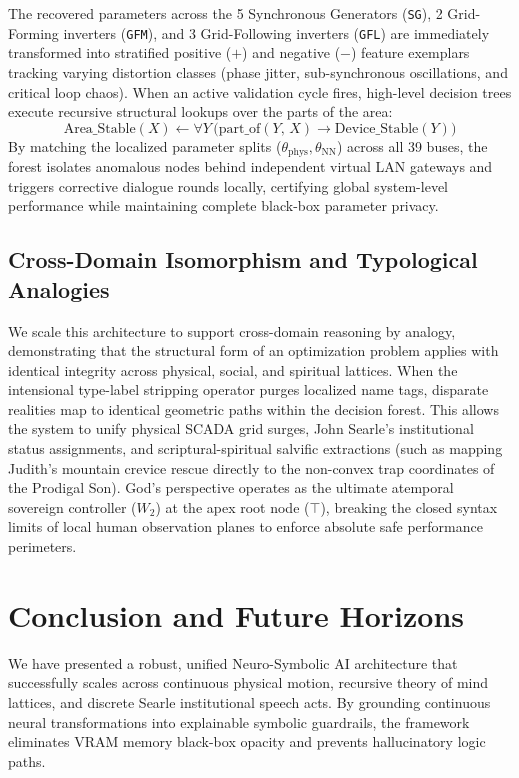 \documentclass[11pt,fleqn]{article}
\begin{document}
The recovered parameters across the 5 Synchronous Generators (\texttt{SG}), 2 Grid-Forming inverters (\texttt{GFM}), and 3 Grid-Following inverters (\texttt{GFL}) are immediately transformed into stratified positive ($+$) and negative ($-$) feature exemplars tracking varying distortion classes (phase jitter, sub-synchronous oscillations, and critical loop chaos). When an active validation cycle fires, high-level decision trees execute recursive structural lookups over the parts of the area:
\begin{equation}
\text{Area\_Stable}(X) \longleftarrow \forall Y \, \Big( \text{part\_of}(Y, \, X) \longrightarrow \text{Device\_Stable}(Y) \Big)
\end{equation}
By matching the localized parameter splits ($\theta_{\text{phys}}, \theta_{\text{NN}}$) across all 39 buses, the forest isolates anomalous nodes behind independent virtual LAN gateways and triggers corrective dialogue rounds locally, certifying global system-level performance while maintaining complete black-box parameter privacy.

\subsection{Cross-Domain Isomorphism and Typological Analogies}
We scale this architecture to support cross-domain reasoning by analogy, demonstrating that the structural form of an optimization problem applies with identical integrity across physical, social, and spiritual lattices. When the intensional type-label stripping operator purges localized name tags, disparate realities map to identical geometric paths within the decision forest. This allows the system to unify physical SCADA grid surges, John Searle's institutional status assignments, and scriptural-spiritual salvific extractions (such as mapping Judith's mountain crevice rescue directly to the non-convex trap coordinates of the Prodigal Son). God's perspective operates as the ultimate atemporal sovereign controller ($W_2$) at the apex root node ($\top$), breaking the closed syntax limits of local human observation planes to enforce absolute safe performance perimeters.

\section{Conclusion and Future Horizons}
We have presented a robust, unified Neuro-Symbolic AI architecture that successfully scales across continuous physical motion, recursive theory of mind lattices, and discrete Searle institutional speech acts. By grounding continuous neural transformations into explainable symbolic guardrails, the framework eliminates VRAM memory black-box opacity and prevents hallucinatory logic paths.
\end{document}

